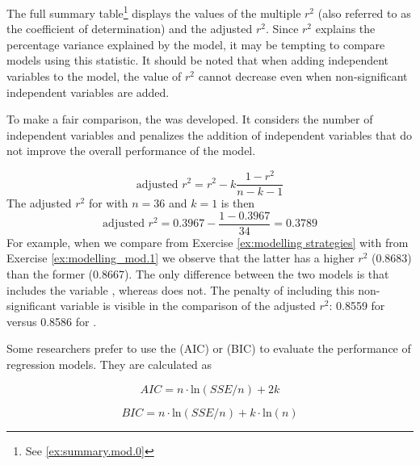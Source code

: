 \bigskip
The full summary table\footnote{See \ref{ex:summary.mod.0}} displays the values of the multiple $r^2$ (also referred to as the coefficient of determination) and the adjusted $r^2$. Since $r^2$ explains the percentage variance explained by the model, it may be tempting to compare models using this statistic. It should be noted that when adding independent variables to the model, the value of $r^2$ cannot decrease even when non-significant independent variables are added.

To make a fair comparison, the  was developed. It considers the number of independent variables and penalizes the addition of independent variables that do not improve the overall performance of the model. 

\begin{equation}
  \text{adjusted } r^2 = r^2 - k \frac{1 - r^2}{n - k - 1}
\end{equation}
The adjusted $r^2$ for  with $n = 36$ and $k = 1$ is then
\begin{equation*}
  \text{adjusted } r^2 = 0.3967 - \frac{1 - 0.3967}{34} = 0.3789
\end{equation*}
For example, when we compare  from Exercise \ref{ex:modelling strategies} with  from Exercise \ref{ex:modelling_mod.1} we observe that the latter has a higher $r^2$ (0.8683) than the former (0.8667). The only difference between the two models is that  includes the variable , whereas  does not. The penalty of including this non-significant variable is visible in the comparison of the adjusted $r^2$: 0.8559 for  versus 0.8586 for .

\bigskip
Some researchers prefer to use the  (AIC) or  (BIC) to evaluate the performance of regression models. They are calculated as

\begin{equation}
\label{eq:aic}
  AIC = n \cdot \text{ln}(SSE / n) + 2k 
\end{equation}

\begin{equation}
\label{eq:bic}
  BIC = n \cdot \text{ln}(SSE / n) + k \cdot \text{ln}(n)
\end{equation}

